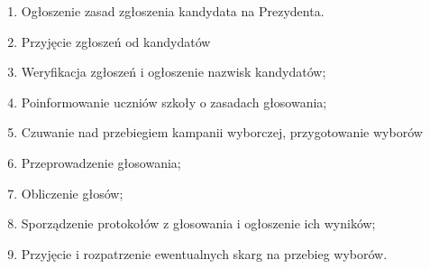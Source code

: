 \documentclass[12pt]{article}
\begin{document}
    \begin{enumerate}
        \item Ogłoszenie zasad zgłoszenia kandydata na Prezydenta.
        \item Przyjęcie zgłoszeń od kandydatów
        \item Weryfikacja zgłoszeń i ogłoszenie nazwisk kandydatów;
        \item Poinformowanie uczniów szkoły o zasadach głosowania;
        \item Czuwanie nad przebiegiem kampanii wyborczej, przygotowanie wyborów
        \item Przeprowadzenie głosowania;
        \item Obliczenie głosów;
        \item Sporządzenie protokołów z głosowania i ogłoszenie ich wyników;
        \item Przyjęcie i rozpatrzenie ewentualnych skarg na przebieg wyborów.
    \end{enumerate}
\end{document}
